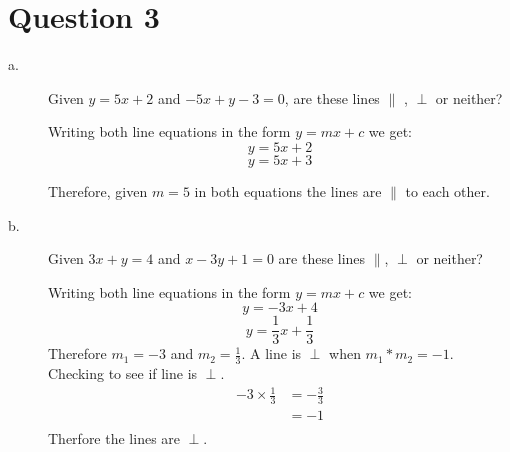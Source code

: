 \documentclass{article}
\begin{document}
\section*{Question 3}

\begin{description}
    \item[a.] \begin{Large}Given $y=5x+2$ and $-5x+y-3=0$, are these lines $\parallel$ , $\perp$ or neither?\end{Large}

        Writing both line equations in the form $y=mx+c$ we get:
        $$
            y = 5x + 2
        $$
        $$
            y = 5x + 3
        $$

        Therefore, given $m=5$ in both equations the lines are $\parallel$ to each other.

    \item[b.] \begin{Large} Given $3x+y=4$ and $x-3y+1=0$ are these lines $\parallel$, $\perp$  or neither?\end{Large}

        Writing both line equations in the form $y=mx+c$ we get:
        $$
            y = -3x+4
        $$
        $$
            y = \frac{1}{3}x + \frac{1}{3}
        $$
        Therefore $m_1=-3$ and $m_2=\frac{1}{3}$.
        A line is $\perp$ when $m_1 * m_2 = -1$.
        Checking to see if line is $\perp$.
        $$
            \begin{aligned}
                -3 \times \frac{1}{3} & = -\frac{3}{3} \\
                                      & = -1           \\
            \end{aligned}
        $$
        Therfore the lines are $\perp$.
\end{description}

\clearpage
\end{document}

